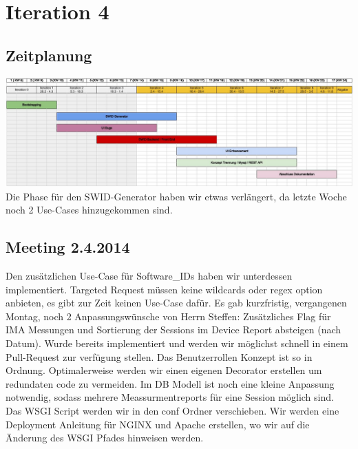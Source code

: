 \section{Iteration 4}
\subsection{Zeitplanung}
\includegraphics[width=\textwidth]{images/zeitplanung/Iteration4.jpg}
Die Phase für den SWID-Generator haben wir etwas verlängert, da letzte Woche noch 2 Use-Cases hinzugekommen sind.
\subsection{Meeting 2.4.2014}
Den zusätzlichen Use-Case für Software\_IDs haben wir unterdessen implementiert. Targeted Request müssen keine wildcards oder regex option anbieten, es gibt zur Zeit keinen Use-Case dafür. Es gab kurzfristig, vergangenen Montag, noch 2 Anpassungswünsche von Herrn Steffen: Zusätzliches Flag für IMA Messungen und  Sortierung der Sessions im Device Report absteigen (nach Datum). Wurde bereits implementiert und werden wir möglichst schnell in einem Pull-Request zur verfügung stellen.
Das Benutzerrollen Konzept ist so in Ordnung. Optimalerweise werden wir einen eigenen Decorator erstellen um redundaten code zu vermeiden. Im DB Modell ist noch eine kleine Anpassung notwendig, sodass mehrere Meassurmentreports für eine Session möglich sind. Das WSGI Script werden wir in den conf Ordner verschieben. Wir werden eine Deployment Anleitung für NGINX und Apache erstellen, wo wir auf die Änderung des WSGI Pfades hinweisen werden. 




